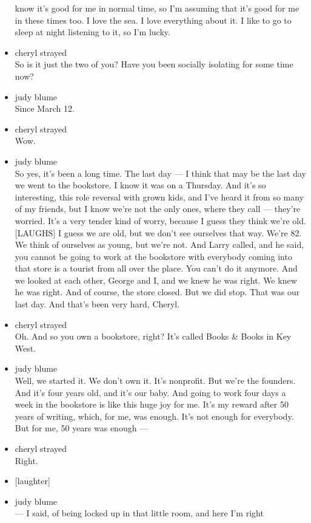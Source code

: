 \begin{itemize}
  know it's good for me in normal time, so I'm assuming that it's good
  for me in these times too. I love the sea. I love everything about it.
  I like to go to sleep at night listening to it, so I'm lucky.
\item
  cheryl strayed\\
  So is it just the two of you? Have you been socially isolating for
  some time now?
\item
  judy blume\\
  Since March 12.
\item
  cheryl strayed\\
  Wow.
\item
  judy blume\\
  So yes, it's been a long time. The last day --- I think that may be
  the last day we went to the bookstore. I know it was on a Thursday.
  And it's so interesting, this role reversal with grown kids, and I've
  heard it from so many of my friends, but I know we're not the only
  ones, where they call --- they're worried. It's a very tender kind of
  worry, because I guess they think we're old. {[}LAUGHS{]} I guess we
  are old, but we don't see ourselves that way. We're 82. We think of
  ourselves as young, but we're not. And Larry called, and he said, you
  cannot be going to work at the bookstore with everybody coming into
  that store is a tourist from all over the place. You can't do it
  anymore. And we looked at each other, George and I, and we knew he was
  right. We knew he was right. And of course, the store closed. But we
  did stop. That was our last day. And that's been very hard, Cheryl.
\item
  cheryl strayed\\
  Oh. And so you own a bookstore, right? It's called Books \& Books in
  Key West.
\item
  judy blume\\
  Well, we started it. We don't own it. It's nonprofit. But we're the
  founders. And it's four years old, and it's our baby. And going to
  work four days a week in the bookstore is like this huge joy for me.
  It's my reward after 50 years of writing, which, for me, was enough.
  It's not enough for everybody. But for me, 50 years was enough ---
\item
  cheryl strayed\\
  Right.
\item
  {[}laughter{]}
\item
  judy blume\\
  --- I said, of being locked up in that little room, and here I'm right

\end{itemize}
